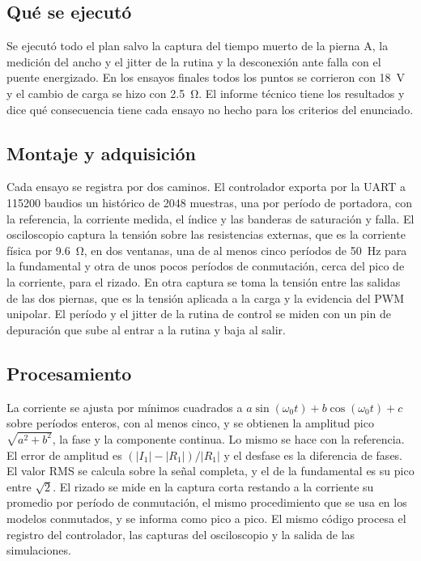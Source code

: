 \documentclass[journal]{IEEEtran}
\begin{document}
\subsection{Qué se ejecutó}
Se ejecutó todo el plan salvo la captura del tiempo muerto de la pierna A, la medición del ancho y el jitter de la rutina y la desconexión ante falla con el puente energizado. En los ensayos finales todos los puntos se corrieron con \SI{18}{V} y el cambio de carga se hizo con \SI{2.5}{\ohm}. El informe técnico tiene los resultados y dice qué consecuencia tiene cada ensayo no hecho para los criterios del enunciado.

\subsection{Montaje y adquisición}
\label{sec:montaje}
Cada ensayo se registra por dos caminos. El controlador exporta por la UART a \num{115200} baudios un histórico de \num{2048} muestras, una por período de portadora, con la referencia, la corriente medida, el índice y las banderas de saturación y falla. El osciloscopio captura la tensión sobre las resistencias externas, que es la corriente física por \SI{9.6}{\ohm}, en dos ventanas, una de al menos cinco períodos de \SI{50}{Hz} para la fundamental y otra de unos pocos períodos de conmutación, cerca del pico de la corriente, para el rizado. En otra captura se toma la tensión entre las salidas de las dos piernas, que es la tensión aplicada a la carga y la evidencia del PWM unipolar. El período y el jitter de la rutina de control se miden con un pin de depuración que sube al entrar a la rutina y baja al salir.

\subsection{Procesamiento}
\label{sec:proc}
La corriente se ajusta por mínimos cuadrados a $a\sin(\omega_0t)+b\cos(\omega_0t)+c$ sobre períodos enteros, con al menos cinco, y se obtienen la amplitud pico $\sqrt{a^2+b^2}$, la fase y la componente continua. Lo mismo se hace con la referencia. El error de amplitud es $(|I_1|-|R_1|)/|R_1|$ y el desfase es la diferencia de fases. El valor RMS se calcula sobre la señal completa, y el de la fundamental es su pico entre $\sqrt2$. El rizado se mide en la captura corta restando a la corriente su promedio por período de conmutación, el mismo procedimiento que se usa en los modelos conmutados, y se informa como pico a pico. El mismo código procesa el registro del controlador, las capturas del osciloscopio y la salida de las simulaciones.
\end{document}
